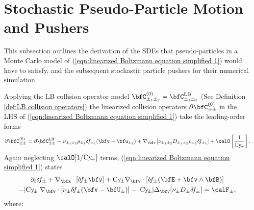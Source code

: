 \section{Stochastic Pseudo-Particle Motion and Pushers}\label{cha:particle motion}
    This subsection outlines the derivation of the SDEs that pseudo-particles in a Monte Carlo model of (\ref{eqn:linearized Boltzmann equation simplified 1}) would have to satisfy, and the subsequent stochastic particle pushers for their numerical simulation.

    \shortline

    Applying the LB collision operator model $\bfC_{\pm_{1}\pm_{2}}^{(0)} = \bfC_{\pm_{1}\pm_{2}}^{\rm LB}$ (See Definition \ref{def:LB collision operators}) the linearized collision operators $\partial\bfC_{\pm\pm}^{(0)}$ in the LHS of (\ref{eqn:linearized Boltzmann equation simplified 1}) take the leading-order forms
    \begin{equation}
           \partial\bfC_{\pm\pm}^{(0)}
        =  \partial\bfC_{\pm\pm}^{\rm LB}
        \sim  \nu_{\pm_{1}\pm_{2}}\rho_{\pm_{2}}\delta\!f_{\pm_{1}}(\bfv - \bfu_{\pm_{2}})
        + \nabla_{\bfv}\left[\nu_{\pm_{1}\pm_{2}}D_{\pm_{1}\pm_{2}}\rho_{\pm_{2}}\delta\!f_{\pm_{1}}\right]
        + \calO\left[\frac{1}{\rmCy\!_{+}}\right].
    \end{equation}
    Again neglecting $\calO[1/\rmCy\!_{+}]$ terms, (\ref{eqn:linearized Boltzmann equation simplified 1}) states
    \begin{multline}\label{eqn:linearized Boltzmann equation simplified 2}
        \partial_{t}\delta\!f_{\pm}
        + \nabla_{\bfx}\cdot[\delta\!f_{\pm}\bfv]
        + \rmCy\!_{\pm}\nabla_{\bfv}\cdot[\delta\!f_{\pm}(\bfE + \bfv\wedge\bfB)]  \\
        - |\rmCy\!_{\pm}|\nabla_{\bfv}\cdot\left[\nu_{\pm}\delta\!f_{\pm}(\bfv - \bfU_{\pm})\right]
        - |\rmCy\!_{\pm}|\Delta_{\bfv}[\nu_{\pm}D_{\pm}\delta\!f_{\pm}]
        =  \calF_{\pm},
    \end{multline}
    where:
